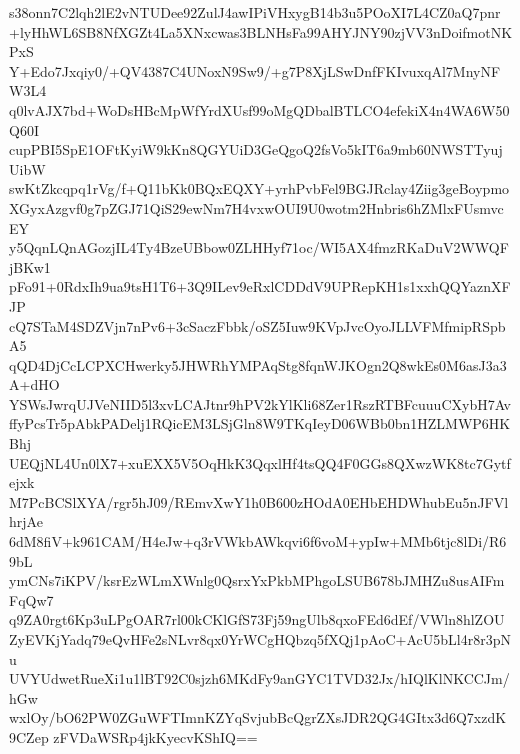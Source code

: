 s38onn7C2lqh2lE2vNTUDee92ZulJ4awIPiVHxygB14b3u5POoXI7L4CZ0aQ7pnr
+lyHhWL6SB8NfXGZt4La5XNxcwas3BLNHsFa99AHYJNY90zjVV3nDoifmotNKPxS
Y+Edo7Jxqiy0/+QV4387C4UNoxN9Sw9/+g7P8XjLSwDnfFKIvuxqAl7MnyNFW3L4
q0lvAJX7bd+WoDsHBcMpWfYrdXUsf99oMgQDbalBTLCO4efekiX4n4WA6W50Q60I
cupPBI5SpE1OFtKyiW9kKn8QGYUiD3GeQgoQ2fsVo5kIT6a9mb60NWSTTyujUibW
swKtZkcqpq1rVg/f+Q11bKk0BQxEQXY+yrhPvbFel9BGJRclay4Ziig3geBoypmo
XGyxAzgvf0g7pZGJ71QiS29ewNm7H4vxwOUI9U0wotm2Hnbris6hZMlxFUsmvcEY
y5QqnLQnAGozjIL4Ty4BzeUBbow0ZLHHyf71oc/WI5AX4fmzRKaDuV2WWQFjBKw1
pFo91+0RdxIh9ua9tsH1T6+3Q9ILev9eRxlCDDdV9UPRepKH1s1xxhQQYaznXFJP
cQ7STaM4SDZVjn7nPv6+3cSaczFbbk/oSZ5Iuw9KVpJvcOyoJLLVFMfmipRSpbA5
qQD4DjCcLCPXCHwerky5JHWRhYMPAqStg8fqnWJKOgn2Q8wkEs0M6asJ3a3A+dHO
YSWsJwrqUJVeNIID5l3xvLCAJtnr9hPV2kYlKli68Zer1RszRTBFcuuuCXybH7Av
ffyPcsTr5pAbkPADelj1RQicEM3LSjGln8W9TKqIeyD06WBb0bn1HZLMWP6HKBhj
UEQjNL4Un0lX7+xuEXX5V5OqHkK3QqxlHf4tsQQ4F0GGs8QXwzWK8tc7Gytfejxk
M7PcBCSlXYA/rgr5hJ09/REmvXwY1h0B600zHOdA0EHbEHDWhubEu5nJFVlhrjAe
6dM8fiV+k961CAM/H4eJw+q3rVWkbAWkqvi6f6voM+ypIw+MMb6tjc8lDi/R69bL
ymCNs7iKPV/ksrEzWLmXWnlg0QsrxYxPkbMPhgoLSUB678bJMHZu8usAIFmFqQw7
q9ZA0rgt6Kp3uLPgOAR7rl00kCKlGfS73Fj59ngUlb8qxoFEd6dEf/VWln8hlZOU
ZyEVKjYadq79eQvHFe2sNLvr8qx0YrWCgHQbzq5fXQj1pAoC+AcU5bLl4r8r3pNu
UVYUdwetRueXi1u1lBT92C0sjzh6MKdFy9anGYC1TVD32Jx/hIQlKlNKCCJm/hGw
wxlOy/bO62PW0ZGuWFTImnKZYqSvjubBcQgrZXsJDR2QG4GItx3d6Q7xzdK9CZep
zFVDaWSRp4jkKyecvKShIQ==
